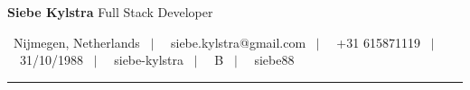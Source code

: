 \begin{center}
{\Large \textbf{Siebe Kylstra} Full Stack Developer}

\vspace{0.3cm}

{\small \faMapMarker \ Nijmegen, Netherlands \ $|$ \ \faEnvelope \ siebe.kylstra@gmail.com \ $|$ \ \faPhone \ +31 615871119 \ $|$ \ \faCalendar \ 31/10/1988 \ $|$ \ \faLinkedin \ siebe-kylstra \ $|$ \ \faCar \ B \ $|$ \ \faGithub \ siebe88}

\end{center}
\rule{\textwidth}{0.5pt}
